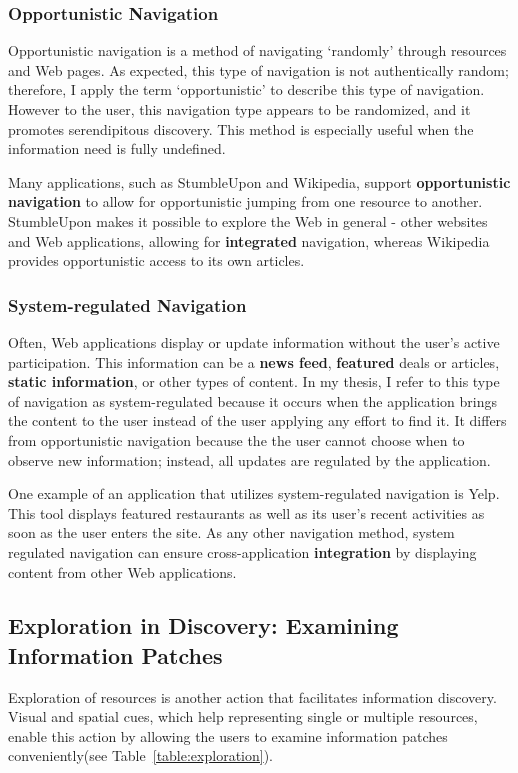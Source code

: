 {{{\subsubsection{Opportunistic Navigation}
Opportunistic navigation is a method of navigating `randomly' through resources and Web pages.  As expected, this type of navigation is not authentically random; therefore, I apply the term `opportunistic' to describe this type of navigation. However to the user, this navigation type appears to be randomized, and it promotes serendipitous discovery. This method is especially useful when the information need is fully undefined.

Many applications, such as StumbleUpon and Wikipedia, support \textbf{opportunistic navigation} to allow for opportunistic jumping from one resource to another. StumbleUpon makes it possible to explore the Web in general - other websites and Web applications, allowing for \textbf{integrated} navigation, whereas Wikipedia provides opportunistic access to its own articles. 
} %

{\subsubsection{System-regulated Navigation}
Often, Web applications display or update information without the user's active participation. This information can be a \textbf{news feed}, \textbf{featured} deals or articles, \textbf{static information}, or other types of content. In my thesis, I refer to this type of navigation as system-regulated because it occurs when the application brings the content to the user instead of the user applying any effort to find it. It differs from opportunistic navigation because the the user cannot choose when to observe new information; instead, all updates are regulated by the application. 

One example of an application that utilizes system-regulated navigation is Yelp. This tool displays featured restaurants as well as its user's recent activities as soon as the user enters the site. As any other navigation method, system regulated navigation can ensure cross-application \textbf{integration} by displaying content from other Web applications. 
} %
} %

\pagebreak
{\subsection{Exploration in Discovery: Examining Information Patches}
Exploration of resources is another action that facilitates information discovery. Visual and spatial cues, which help representing single or multiple resources, enable this action by allowing the users to examine information patches conveniently(see Table~\ref{table:exploration}). 


}}
